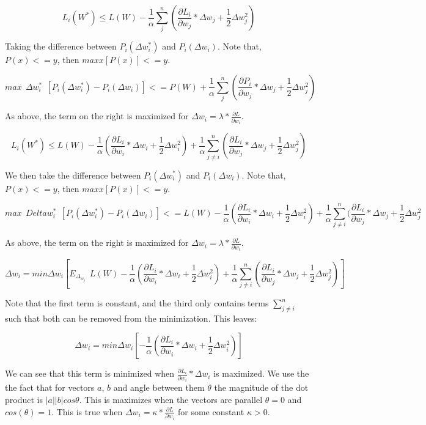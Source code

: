 \documentclass{article}
\begin{document}
\[ L_i(W^*) \leq L(W) - \frac{1}{\alpha} \sum_{j}^{n} (\frac{\partial L_i}{\partial w_j} * \Delta w_j + \frac{1}{2} \Delta w_j^2)  \]

Taking the difference between $P_i(\Delta w_i^*)$ and $P_i(\Delta w_i)$. Note that, $P(x) <= y$, then $max x [ P(x) ] <= y$.

\[ max \ \ \Delta w_i^* \ \ [P_i(\Delta w_i^*) - P_i(\Delta w_i)] <= P(W) + \frac{1}{\alpha} \sum_{j}^{n} (\frac{\partial P_i}{\partial w_j} * \Delta w_j + \frac{1}{2} \Delta w_j^2) \]

As above, the term on the right is maximized for $\Delta w_i = \lambda * \frac{\partial L}{\partial w_i}$.


\[ L_i(W^*) \leq L(W) - \frac{1}{\alpha} (\frac{\partial L_i}{\partial w_i} * \Delta w_i + \frac{1}{2} \Delta w_i^2) + \frac{1}{\alpha} \sum_{j \neq i}^{n} (\frac{\partial L_i}{\partial w_j} * \Delta w_j + \frac{1}{2} \Delta w_j^2)  \]


We then take the difference between $P_i(\Delta w_i^*)$ and $P_i(\Delta w_i)$. Note that, $P(x) <= y$, then $max x [ P(x) ] <= y$.

\[ max \ \ Delta w_i^* \ \ [P_i(\Delta w_i^*) - P_i(\Delta w_i)] <= L(W) - \frac{1}{\alpha} (\frac{\partial L_i}{\partial w_i} * \Delta w_i + \frac{1}{2} \Delta w_i^2) + \frac{1}{\alpha} \sum_{j \neq i}^{n} (\frac{\partial L_i}{\partial w_j} * \Delta w_j + \frac{1}{2} \Delta w_j^2 \]

As above, the term on the right is maximized for $\Delta w_i = \lambda * \frac{\partial L}{\partial w_i}$.



\[ \Delta w_i = min \Delta w_i [ E_\Delta_w_j \ \ L(W) - \frac{1}{\alpha} (\frac{\partial L_i}{\partial w_i} * \Delta w_i + \frac{1}{2} \Delta w_i^2) + \frac{1}{\alpha} \sum_{j \neq i}^{n} (\frac{\partial L_i}{\partial w_j} * \Delta w_j + \frac{1}{2} \Delta w_j^2) ]\] 

Note that the first term is constant, and the third only contains terms $\sum_{j \neq i}^{n}$ such that both can be removed from the minimization. This leaves:

\[ \Delta w_i = min \Delta w_i [ - \frac{1}{\alpha} (\frac{\partial L_i}{\partial w_i} * \Delta w_i + \frac{1}{2} \Delta w_i^2) ] \]

We can see that this term is minimized when $\frac{\partial L_i}{\partial w_i} * \Delta w_i$ is maximized. We use the the fact that for vectors $a$, $b$ and angle between them $\theta$ the magnitude of the dot product is $|a||b|cos \theta$. This is maximizes when the vectors are parallel $\theta = 0$ and $cos(\theta) = 1$. This is true when $\Delta w_i = \kappa* \frac{\partial L}{\partial w_i}$ for some constant $\kappa > 0$.
\end{document}

